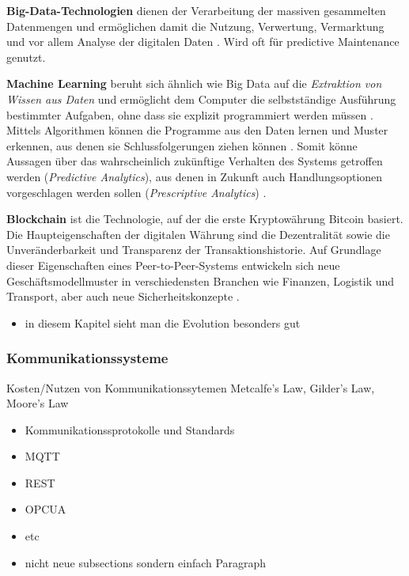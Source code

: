 \noindent\hspace*{10mm}
 \textbf{Big-Data-Technologien} dienen der Verarbeitung der massiven gesammelten Datenmengen und ermöglichen damit die Nutzung, Verwertung, Vermarktung und vor allem Analyse der digitalen Daten \citep{Radtke2019}. Wird oft für predictive Maintenance genutzt.

 \noindent\hspace*{10mm}
 \textbf{Machine Learning} beruht sich ähnlich wie Big Data auf die \textit{Extraktion von Wissen aus Daten} und ermöglicht dem Computer die selbstständige Ausführung bestimmter Aufgaben, ohne dass sie explizit programmiert werden müssen \citep{Hnisch2017}. Mittels Algorithmen können die Programme aus den Daten lernen und Muster erkennen, aus denen sie Schlussfolgerungen ziehen können \citep{Elsner2018}. Somit könne Aussagen über das wahrscheinlich zukünftige Verhalten des Systems getroffen werden (\textit{Predictive Analytics}), aus denen in Zukunft auch Handlungsoptionen vorgeschlagen werden sollen (\textit{Prescriptive Analytics}) \citep{Huebschle2017}.

 \noindent\hspace*{10mm}
 \textbf{Blockchain} ist die Technologie, auf der die erste Kryptowährung Bitcoin basiert. Die Haupteigenschaften der digitalen Währung sind die Dezentralität sowie  die Unveränderbarkeit und Transparenz der Transaktionshistorie. Auf Grundlage dieser Eigenschaften eines Peer-to-Peer-Systems entwickeln sich neue Geschäftsmodellmuster in verschiedensten Branchen wie Finanzen,  Logistik und Transport, aber auch neue Sicherheitskonzepte \citep{Elsner2018}.

\begin{itemize}
  \item in diesem Kapitel sieht man die Evolution besonders gut
\end{itemize}

\subsubsection{Kommunikationssysteme}
Kosten/Nutzen von Kommunikationssytemen
Metcalfe’s Law, Gilder’s Law, Moore’s Law
\begin{itemize}
  \item Kommunikationssprotokolle und Standards
  \item MQTT
  \item REST
  \item OPCUA
  \item etc
  \item nicht neue subsections sondern einfach Paragraph
\end{itemize}
